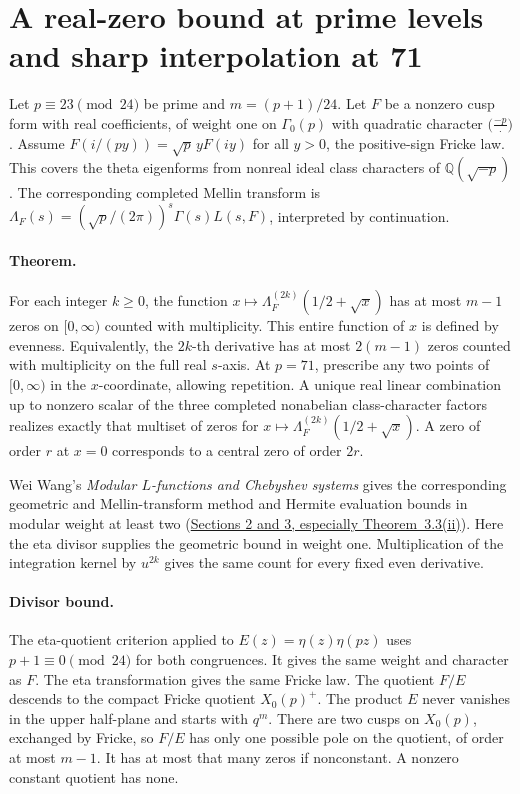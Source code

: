 \section{A real-zero bound at prime levels and sharp interpolation at 71}

Let $p\equiv23\pmod{24}$ be prime and $m=(p+1)/24$.
Let $F$ be a nonzero cusp form with real coefficients, of weight one on
$\Gamma_0(p)$ with quadratic character $\bigl(\frac{-p}{\cdot}\bigr)$.
Assume $F(i/(py))=\sqrt p\,y F(iy)$ for all $y>0$, the positive-sign
Fricke law. This covers the theta eigenforms from nonreal ideal class
characters of $\mathbb Q(\sqrt{-p})$. The corresponding completed
Mellin transform is $\Lambda_F(s)=(\sqrt p/(2\pi))^s\Gamma(s)L(s,F)$,
interpreted by continuation.

\paragraph{Theorem.} For each integer $k\ge0$, the function
$x\mapsto\Lambda_F^{(2k)}(1/2+\sqrt x)$ has at most $m-1$ zeros on
$[0,\infty)$ counted with multiplicity. This entire function of $x$ is
defined by evenness. Equivalently, the $2k$-th derivative has at most
$2(m-1)$ zeros counted with multiplicity on the full real $s$-axis.
At $p=71$, prescribe any two points of $[0,\infty)$ in the $x$-coordinate,
allowing repetition. A unique real linear combination up to nonzero
scalar of the three completed nonabelian class-character factors realizes
exactly that multiset of zeros for $x\mapsto\Lambda_F^{(2k)}(1/2+\sqrt{x})$.
A zero of order $r$ at $x=0$ corresponds to a central zero of order $2r$.

Wei Wang's \emph{Modular $L$-functions and Chebyshev systems} gives the
corresponding geometric and Mellin-transform method and Hermite evaluation
bounds in modular weight at least two
(\href{https://arxiv.org/abs/2611.02933}{Sections 2 and 3, especially Theorem~3.3(ii)}).
Here the eta divisor supplies the geometric bound in weight one. Multiplication
of the integration kernel by $u^{2k}$ gives the same count for every fixed
even derivative.

\paragraph{Divisor bound.}
The eta-quotient criterion applied to $E(z)=\eta(z)\eta(pz)$
uses $p+1\equiv0\pmod{24}$ for both congruences. It gives the same
weight and character as $F$. The eta transformation gives the same Fricke law.
The quotient $F/E$ descends to the compact Fricke quotient $X_0(p)^+$.
The product $E$ never vanishes in the upper half-plane and starts with $q^m$.
There are two cusps on $X_0(p)$, exchanged by Fricke, so $F/E$ has only
one possible pole on the quotient, of order at most $m-1$. It has at most
that many zeros if nonconstant. A nonzero constant quotient has none.


